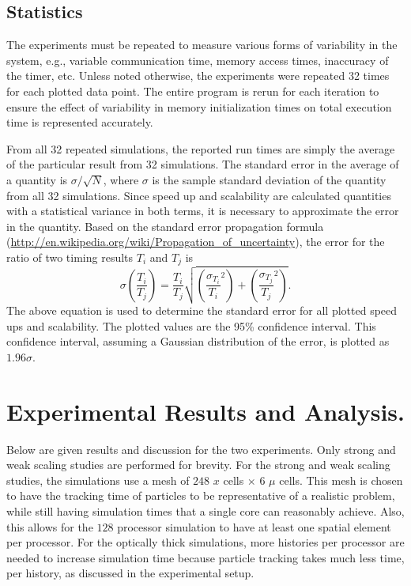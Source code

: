 \documentclass[12pt]{article}
\begin{document}
{{{\subsection{Statistics}

The experiments must be repeated to measure various forms of variability in the
system, e.g., variable communication time, memory access times, inaccuracy of the
timer, etc.  Unless noted otherwise, the experiments were repeated 32 times for each
plotted data point.  The entire program is rerun for each iteration to ensure the
effect of variability in memory initialization times on total execution time is represented
accurately.  

From all 32 repeated simulations, the reported run times are simply the average of
the particular result from 32
simulations. The standard error in the average of a quantity is $\sigma/\sqrt{N}$,
where $\sigma$ is the sample standard deviation of the quantity from all 32 simulations.  Since speed up and
scalability are calculated quantities with a statistical variance in both terms, it
is necessary to approximate the error in the quantity.  
Based on the standard error propagation formula
(\url{http://en.wikipedia.org/wiki/Propagation_of_uncertainty}), the error for the
ratio of two timing results $T_i$ and $T_j$ is
\begin{equation}
    \sigma \left( \frac{T_i}{T_j} \right) = \frac{T_i}{T_j}
    \sqrt{\left(\frac{\sigma_{T_i}}{T_i}^2\right) + 
    \left(\frac{\sigma_{T_j}}{T_j}^2\right)}
    \label{err}.
\end{equation}
The above equation is used to determine the standard error for all plotted speed ups
and scalability.  The plotted values are the 95\% confidence interval. This
confidence interval, assuming a
Gaussian distribution of the error, is plotted as $1.96 \sigma$.

\section{Experimental Results and Analysis.}

Below are given results and discussion for the two experiments. Only strong and weak
scaling studies are performed for brevity.  For the strong
and weak scaling studies, the simulations use a mesh of $248$ $x$ cells $\times$ $6$
$\mu$ cells.  This mesh is chosen to have the tracking time of
particles to be representative of a realistic problem, while still having simulation
times that a single core can reasonably achieve. Also, this allows for the $128$ processor simulation to have at least one
spatial element per processor.  For the optically thick simulations, more histories per
processor are needed to increase simulation time because particle tracking takes much
less time, per history, as discussed in the experimental setup.

}}}
\end{document}
